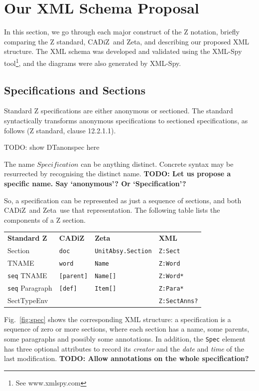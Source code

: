 \documentclass{llncs}  %
\newcommand{\AFont}[1]{\texttt{#1}}
\newcommand{\CADiZ}{CADiZ}
\newcommand{\Zeta}{Zeta}
\newcommand{\ASection}{Section}
\newcommand{\AParagraph}{Paragraph}
\newcommand{\TNAME}{TNAME}
\newcommand{\ASectTypeEnv}{SectTypeEnv}
\newcommand{\DTanonspec}{\par TODO: show DTanonspec here \par}
\newcommand{\TODO}[1]{\textbf{TODO: #1}}   %
\begin{document}
\section{Our XML Schema Proposal}

In this section, we go through each major construct of the
Z notation, briefly comparing the Z standard, \CADiZ\ and \Zeta,
and describing our proposed XML structure.  The XML schema was
developed and validated using the XML-Spy tool\footnote{See
  www.xmlspy.com}, and the diagrams were also generated by XML-Spy.

\subsection{Specifications and Sections}\label{Specification}

Standard Z specifications are either anonymous or sectioned.
The standard syntactically transforms anonymous specifications
to sectioned specifications, as follows (Z standard, clause 12.2.1.1).
\DTanonspec
The name $Specification$ can be anything distinct.
Concrete syntax may be resurrected by recognising the distinct name.
\TODO{Let us propose a specific name.  Say `anonymous'?  Or
  `Specification'?}

So, a specification can be represented as just a sequence of sections,
and both \CADiZ\ and \Zeta\ use that representation.
The following table lists the components of a Z section.
\begin{center}
\begin{tabular}{|l|l|l|l|}
\hline
{\bf Standard Z} & {\bf \CADiZ} & {\bf \Zeta} & {\bf XML}\\
\ASection & \AFont{doc} & \AFont{UnitAbsy.Section} & \AFont{Z:Sect}\\
\hline
\TNAME & \AFont{word} & \AFont{Name} & \AFont{Z:Word}\\
\AFont{seq} \TNAME & \AFont{[parent]} & \AFont{Name[]} & \AFont{Z:Word*}\\
\AFont{seq} \AParagraph & \AFont{[def]} & \AFont{Item[]} & \AFont{Z:Para*}\\
\ASectTypeEnv & & & \AFont{Z:SectAnns?}\\
\hline
\end{tabular}
\end{center}

Fig.~\ref{fig:spec}
shows the corresponding XML structure: a specification is a sequence of
zero or more sections, where each section has a name, some parents, 
some paragraphs and possibly some annotations.  In addition, the
\AFont{Spec} element has three optional attributes to record its
\emph{creator} and the \emph{date} and \emph{time} of the last
modification. 
\TODO{Allow annotations on the whole specification?}
\end{document}
